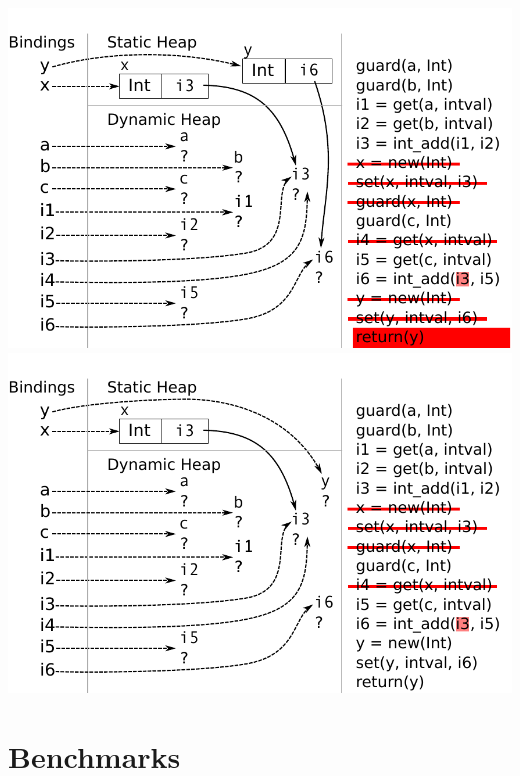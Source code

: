 \documentclass[utf8x]{beamer}
\begin{document}
\begin{frame}[plain]
{\includegraphics[scale=0.8]{figures/ex15}}
{\includegraphics[scale=0.8]{figures/ex16}}
\end{frame}

\section{Benchmarks}
\end{document}
